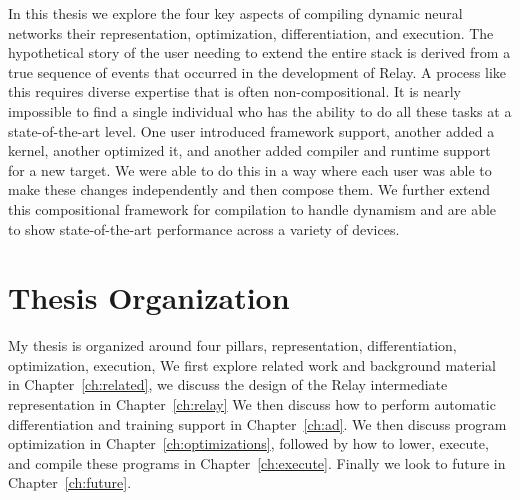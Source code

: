 In this thesis we explore the four key aspects of compiling dynamic
  neural networks their representation, optimization, differentiation,
  and execution.
The hypothetical story of the user needing to extend the entire stack is derived
  from a true sequence of events that occurred in the development of Relay.
A process like this requires diverse expertise that is often non-compositional.
It is nearly impossible to find a single individual who has the ability
  to do all these tasks at a state-of-the-art level.
One user introduced framework support, another added a kernel, another optimized it,
  and another added compiler and runtime support for a new target.
We were able to do this in a way where each user was able to make these
  changes independently and then compose them.
We further extend this compositional framework for compilation to handle dynamism
  and are able to show state-of-the-art performance across a variety of devices.

\section{Thesis Organization}

My thesis is organized around four pillars, representation, differentiation, optimization, execution,
We first explore related work and background material in Chapter~\ref{ch:related},
  we discuss the design of the Relay intermediate representation in Chapter~\ref{ch:relay}
We then discuss how to perform automatic differentiation and training support in Chapter~\ref{ch:ad}.
We then discuss program optimization in Chapter~\ref{ch:optimizations},
  followed by how to lower, execute, and compile these programs in
  Chapter~\ref{ch:execute}.
Finally we look to future in Chapter~\ref{ch:future}.




